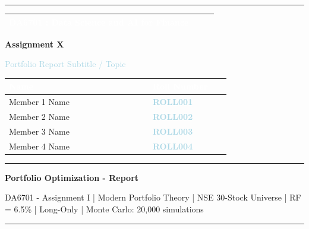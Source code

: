 \documentclass[10pt,a4paper]{article}
\renewcommand{\arraystretch}{1.18}
\newcommand{\CoverCourse}{DA6701 : Data Science and AI for Finance}
\newcommand{\CoverAssignment}{Assignment X}
\newcommand{\CoverTopic}{Portfolio Report Subtitle / Topic}
\newcommand{\MemberOneName}{Member 1 Name}
\newcommand{\MemberOneRoll}{ROLL001}
\newcommand{\MemberTwoName}{Member 2 Name}
\newcommand{\MemberTwoRoll}{ROLL002}
\newcommand{\MemberThreeName}{Member 3 Name}
\newcommand{\MemberThreeRoll}{ROLL003}
\newcommand{\MemberFourName}{Member 4 Name}
\newcommand{\MemberFourRoll}{ROLL004}
\newcommand{\ReportTitle}{Portfolio Optimization - Report}
\newcommand{\ReportSubtitle}{DA6701 - Assignment I | Modern Portfolio Theory | NSE 30-Stock Universe | RF = 6.5\% | Long-Only | Monte Carlo: 20,000 simulations}
\begin{document}
\color{BodyGray}
\thispagestyle{empty}

\begin{center}
  \vspace*{0.3cm}
  \textcolor{ReportBlue}{\rule{0.98\linewidth}{1.2pt}}

  \vspace{1.05cm}
  \begin{tabular}{|>{\centering\arraybackslash}p{0.90\linewidth}|}
    \hline
    \rowcolor{LightBlue}
    \textcolor{white}{\fontsize{12}{14}\selectfont\textbf{\CoverCourse}} \\
    \hline
  \end{tabular}

  \vspace{1.55cm}
  {\fontsize{30}{34}\selectfont\textbf{\textcolor{ReportBlue}{\CoverAssignment}}}\par
  \vspace{3pt}
  {\fontsize{20}{24}\selectfont\textcolor{LightBlue}{\CoverTopic}}\par

  \vspace{1.7cm}
  {\renewcommand{\arraystretch}{1.30}
  \begin{tabular}{|>{\centering\arraybackslash}p{0.48\linewidth}|>{\centering\arraybackslash}p{0.26\linewidth}|}
    \hline
    \rowcolor{ReportBlue}
    \textcolor{white}{\textbf{Name}} & \textcolor{white}{\textbf{Roll Number}} \\
    \hline
    \MemberOneName & \textcolor{LightBlue}{\textbf{\MemberOneRoll}} \\
    \MemberTwoName & \textcolor{LightBlue}{\textbf{\MemberTwoRoll}} \\
    \MemberThreeName & \textcolor{LightBlue}{\textbf{\MemberThreeRoll}} \\
    \MemberFourName & \textcolor{LightBlue}{\textbf{\MemberFourRoll}} \\
    \hline
  \end{tabular}}

  \vfill
  \textcolor{MidGray}{\rule{0.96\linewidth}{0.8pt}}
\end{center}
\newpage

\begin{center}
  {\fontsize{15}{18}\selectfont\textbf{\textcolor{ReportBlue}{\ReportTitle}}}\par
  \vspace{1pt}
  {\fontsize{8}{10}\selectfont\textcolor{CaptionGray}{\ReportSubtitle}}
\end{center}
\vspace{4pt}
\noindent\textcolor{ReportBlue}{\rule{\linewidth}{2pt}}
\vspace{5pt}
\end{document}
